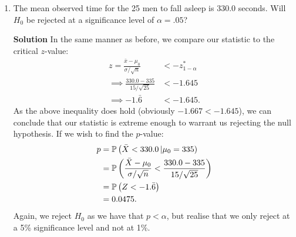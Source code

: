 \begin{enumerate}
\begin{enumerate}
        \item The mean observed time for the 25 men to fall asleep is 330.0 seconds. Will $H_0$ be rejected at a significance level of $\alpha = .05$?
        \begin{framed}{\textbf{Solution}}
        In the same manner as before, we compare our statistic to the critical $z$-value:
        \begin{align}
            z = \frac{\bar{x} - \mu_0}{\sigma/\sqrt{n}} &< -z^*_{1 -\alpha} \\
            \implies \frac{330.0 - 335}{15/\sqrt{25}} &< -1.645 \\
            \implies -1.\bar{6} &< -1.645.
        \end{align}
        As the above inequality does hold (obviously $-1.667<-1.645$), we can conclude that our statistic is extreme enough to warrant us rejecting the null hypothesis. If we wish to find the $p$-value:
        \begin{align}
            p &= \operatorname{\mathbb{P}}{\left( \bar{X}<330.0 \left| \mu_0 = 335 \right) \right. } \\
            &= \operatorname{\mathbb{P}}{\left( \frac{\bar{X} - \mu_0}{\sigma/\sqrt{n}} < \frac{330.0 - 335}{15/\sqrt{25}}\right)} \\
            &= \operatorname{\mathbb{P}}{\left( Z < -1.\bar{6}\right)} \\
            &= 0.0475.
        \end{align}
        Again, we reject $H_0$ as we have that $p<\alpha$, but realise that we only reject at a 5\% significance level and not at 1\%. 
        \end{framed}
        

\end{enumerate}
\end{enumerate}
